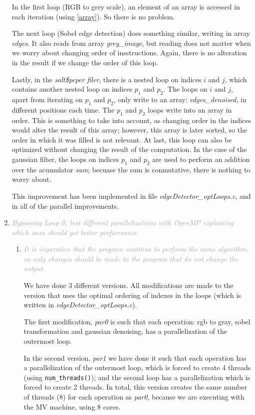 \documentclass{article}
\newcommand{\greyItem}[1]{\item\emph{\textcolor{darkgray}{#1}}}
\begin{document}
\begin{enumerate}[label=5.\arabic*,leftmargin=*]
In the first loop (RGB to grey scale), an element of an array is accessed in each iteration (using \ref{array}). So there is no problem.

The next loop (Sobel edge detection) does something similar, writing in array \emph{edges}. It also reads from array \emph{grey\_image}, but reading does not matter when we worry about changing order of insstructions. Again, there is no alteration in the result if we change the order of this loop.

Lastly, in the \emph{salt\$peper filer}, there is a nested loop on indices $i$ and $j$, which contains another nested loop on indices $p_1$ and $p_2$. The loops on $i$ and $j$, apart from iterating on $p_1$ and $p_2$, only write to an array: \emph{edges\_denoised}, in different positions each time. The $p_1$ and $p_2$ loops write into an array in order. This is something to take into account, as changing order in the indices would alter the result of this array; however, this array is later sorted, so the order in which it was filled is not relevant. At last, this loop can also be optimized without changing the result of the computation. In the case of the gaussian filter, the loops on indices $p_1$ and $p_2$ are used to perform an addition over the acumulator \emph{sum}; becuase the sum is conmutative, there is nothing to worry about. 

This improvement has been implemented in file \emph{edgeDetector\_optLoops.c}, and in all of the parallel improvements.

\greyItem{Bypassing Loop 0, test different parallelizations with OpenMP explaining which ones should get better performance.}
    \begin{enumerate}
        \greyItem{It is imperative that the program continue to perform the same algorithm, so only changes should be made to the program that do not change the output.}
            
We have done 3 different versions. All modifications are made to the version that uses the optimal ordering of indexes in the loops (which is written in \emph{edgeDetector\_optLoops.c}).

The first modification, \emph{par0} is such that each operation: rgb to gray, sobel transformation and gaussian denoising, has a parallelization of the outermost loop.

In the second version, \emph{par1} we have done it such that each operation has a parallelization of the outermost loop, which is forced to create 4 threads (using \texttt{num\_threads()}); and the second loop has a parallelization which is forced to create 2 threads. In total, this version creates the same number of threads ($8$) for each operation as \emph{par0}, because we are executing with the MV machine, using 8 cores.


\end{enumerate}
\end{enumerate}
\end{document}
